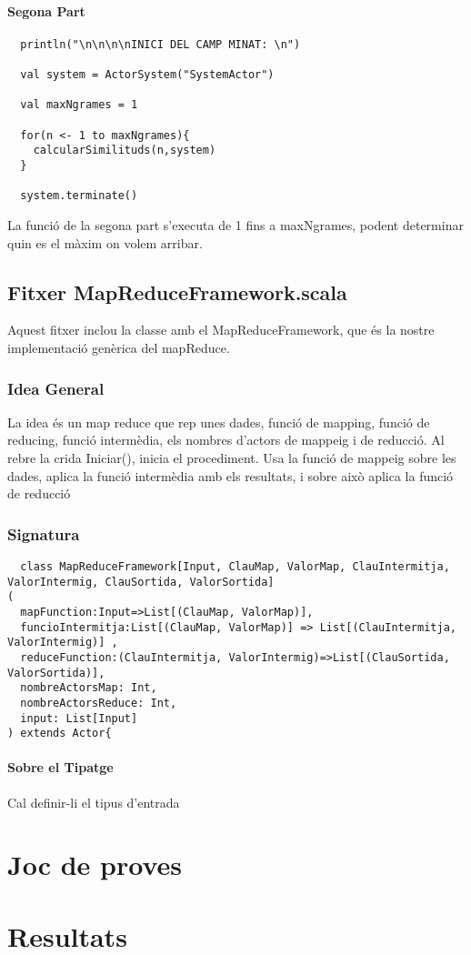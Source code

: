 \documentclass[11pt,a4paper,twoside]{report}
\begin{document}
\subsubsection{Segona Part}

\begin{lstlisting}    
  println("\n\n\n\nINICI DEL CAMP MINAT: \n")

  val system = ActorSystem("SystemActor")

  val maxNgrames = 1

  for(n <- 1 to maxNgrames){
    calcularSimilituds(n,system)
  }

  system.terminate()
\end{lstlisting}

La funció de la segona part s'executa de 1 fins a maxNgrames, podent determinar quin es el màxim on volem arribar.


\section{Fitxer MapReduceFramework.scala}

Aquest fitxer inclou la classe amb el MapReduceFramework, que és la nostre implementació genèrica del mapReduce. 

\subsection{Idea General}
La idea és un map reduce que rep unes dades, funció de mapping, funció de reducing, funció intermèdia, els nombres d'actors de mappeig i de reducció.
Al rebre la crida Iniciar(), inicia el procediment. Usa la funció de mappeig sobre les dades, aplica la funció intermèdia amb els resultats, i sobre això aplica la funció de reducció 

\subsection{Signatura}

\begin{lstlisting}
  class MapReduceFramework[Input, ClauMap, ValorMap, ClauIntermitja, ValorIntermig, ClauSortida, ValorSortida]
(
  mapFunction:Input=>List[(ClauMap, ValorMap)],
  funcioIntermitja:List[(ClauMap, ValorMap)] => List[(ClauIntermitja, ValorIntermig)] ,
  reduceFunction:(ClauIntermitja, ValorIntermig)=>List[(ClauSortida, ValorSortida)],
  nombreActorsMap: Int,
  nombreActorsReduce: Int,
  input: List[Input]
) extends Actor{
\end{lstlisting}

\subsubsection{Sobre el Tipatge}

Cal definir-li el tipus d'entrada






\chapter{Joc de proves}

\chapter{Resultats}
\end{document}
